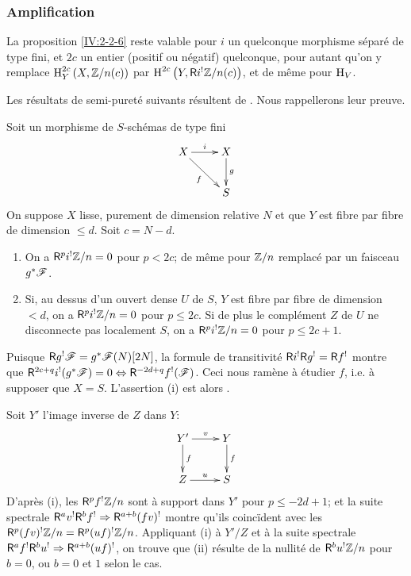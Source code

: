 \subsubsection{Amplification}{\label{IV:2-2-7}

La proposition \ref{IV:2-2-6} reste valable pour $i$ un quelconque morphisme 
s\'epar\'e de type fini, et $2 c$ un entier (positif ou n\'egatif) quelconque, 
pour autant qu'on y remplace $\operatorname{H}_Y^{2 c}\left(X,\mathbb{Z}/n(c)\right)$ par 
$\operatorname{H}^{2 c}\left(Y,\mathsf{R} i^!\mathbb{Z}/n(c)\right)$, et de m\^eme pour $\operatorname{H}_V$. 

Les r\'esultats de semi-puret\'e suivants r\'esultent de 
\cite[1.8, 1.10, 1.15]{sga2}. Nous rappellerons leur preuve. 





\begin{theorem}\label{IV:2-2-8}
Soit un morphisme de $S$-sch\'emas de type fini 
\[\xymatrix{
  X \ar[r]^-i \ar[dr]_-f 
    & X \ar[d]^-g \\
  & S
}\]
On suppose $X$ lisse, purement de dimension relative $N$ et que $Y$ est fibre 
par fibre de dimension $\leqslant d$. Soit $c=N-d$. 
\begin{enumerate}[\indent (i)]
  \item On a $\mathsf{R}^p i^!\mathbb{Z}/n=0$ pour $p<2 c$; de m\^eme pour $\mathbb{Z}/n$ remplac\'e 
    par un faisceau $g^* \mathscr{F}$.
  \item Si, au dessus d'un ouvert dense $U$ de $S$, $Y$ est fibre par fibre de 
    dimension $<d$, on a $\mathsf{R}^p i^!\mathbb{Z}/n=0$ pour $p\leqslant 2 c$. Si de plus le 
    compl\'ement $Z$ de $U$ ne disconnecte pas localement $S$, on a 
    $\mathsf{R}^pi^!\mathbb{Z}/n=0$ pour $p\leqslant 2 c+1$.
\end{enumerate}
\end{theorem}

Puisque $\mathsf{R} g^! \mathscr{F}=g^*\mathscr{F}(N)[2N]$, la formule de transitivit\'e 
$\mathsf{R} i^!\mathsf{R} g^!=\mathsf{R} f^!$ montre que 
$\mathsf{R}^{2 c+q} i^!(g^*\mathscr{F})=0\Leftrightarrow \mathsf{R}^{-2 d+q}f^!(\mathscr{F})$. Ceci nous 
ram\`ene \`a \'etudier $f$, i.e. \`a supposer que $X=S$. L'assertion (i) est 
alors \cite[XVIII 3.17]{sga4}. 

Soit $Y'$ l'image inverse de $Z$ dans $Y$:
\[\xymatrix{
  Y' \ar[r]^-v \ar[d]^-f 
    & Y \ar[d]^-f \\
  Z \ar[r]^-u 
    & S
}\]
D'apr\`es (i), les $\mathsf{R}^p f^! \mathbb{Z}/n$ sont \`a support dans $Y'$ pour 
$p\leqslant -2 d+1$; et la suite spectrale 
$\mathsf{R}^a v^!\mathsf{R}^b f^! \Rightarrow \mathsf{R}^{a+b} (f v)^!$ montre qu'ils coinc\"ident avec 
les $\mathsf{R}^p(f v)^!\mathbb{Z}/n=\mathsf{R}^p(u f)^!\mathbb{Z}/n$. Appliquant (i) \`a $Y'/Z$ et \`a la 
suite spectrale $\mathsf{R}^a f^!\mathsf{R}^b u^! \Rightarrow \mathsf{R}^{a+b} (u f)^!$, on trouve que 
(ii) r\'esulte de la nullit\'e de $\mathsf{R}^b u^! \mathbb{Z}/n$ pour $b=0$, ou $b=0$ et $1$ 
selon le cas. 





}
